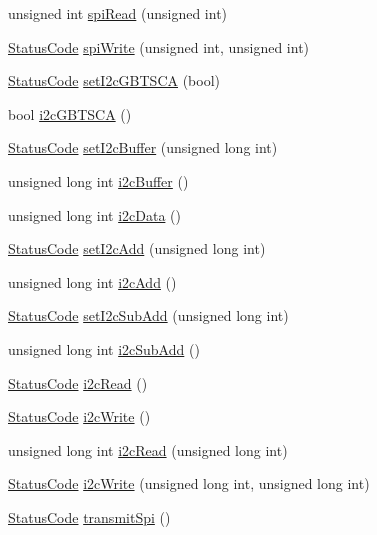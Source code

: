 \begin{DoxyCompactItemize}
\item 
unsigned int \hyperlink{classSeqPGA_a654a40dc597227e59458631f49ff598f}{spi\+Read} (unsigned int)
\item 
\hyperlink{classStatusCode}{Status\+Code} \hyperlink{classSeqPGA_a3cc382925053df4b2fc7d3a99b4def20}{spi\+Write} (unsigned int, unsigned int)
\item 
\hyperlink{classStatusCode}{Status\+Code} \hyperlink{classSeqPGA_aef7911620b07d8aeef2a9ec95fa58ca4}{set\+I2c\+G\+B\+T\+S\+CA} (bool)
\item 
bool \hyperlink{classSeqPGA_a1d9edf6e3303581efe0bdb1b8b3fff0c}{i2c\+G\+B\+T\+S\+CA} ()
\item 
\hyperlink{classStatusCode}{Status\+Code} \hyperlink{classSeqPGA_ab93beca49a31c1f9fddc915e9efeeaa0}{set\+I2c\+Buffer} (unsigned long int)
\item 
unsigned long int \hyperlink{classSeqPGA_a3d441522bfe5a6d35b8a77cbcd38b49e}{i2c\+Buffer} ()
\item 
unsigned long int \hyperlink{classSeqPGA_a5e48f7b7ca1ada5a1decc0436dda4b26}{i2c\+Data} ()
\item 
\hyperlink{classStatusCode}{Status\+Code} \hyperlink{classSeqPGA_a4ef334e4d2cb417b49033dce951728cd}{set\+I2c\+Add} (unsigned long int)
\item 
unsigned long int \hyperlink{classSeqPGA_a67022684977cb2f6335eb6b21262fe89}{i2c\+Add} ()
\item 
\hyperlink{classStatusCode}{Status\+Code} \hyperlink{classSeqPGA_a348c5d982223fb5cf2878e5bf3c6429c}{set\+I2c\+Sub\+Add} (unsigned long int)
\item 
unsigned long int \hyperlink{classSeqPGA_a6c7137f9b45a20ecfcccf1d47e5af985}{i2c\+Sub\+Add} ()
\item 
\hyperlink{classStatusCode}{Status\+Code} \hyperlink{classSeqPGA_a7cd344df2be99f3a02b487f80e87b27e}{i2c\+Read} ()
\item 
\hyperlink{classStatusCode}{Status\+Code} \hyperlink{classSeqPGA_a429076ca3a4ece94182bd95c623bb9d0}{i2c\+Write} ()
\item 
unsigned long int \hyperlink{classSeqPGA_a9cf54d57d77b04f54cc0fe516c3528b4}{i2c\+Read} (unsigned long int)
\item 
\hyperlink{classStatusCode}{Status\+Code} \hyperlink{classSeqPGA_a4176b2047888421f8766d038e35bccfd}{i2c\+Write} (unsigned long int, unsigned long int)
\item 
\hyperlink{classStatusCode}{Status\+Code} \hyperlink{classSeqPGA_a579b4ab222e1c4778640948fbf2a8805}{transmit\+Spi} ()
\item 

\end{DoxyCompactItemize}
